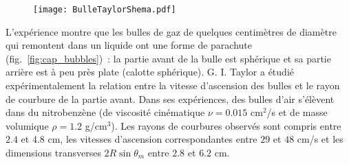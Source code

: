 \begin{figure}
  \begin{center}
\vspace{-9cm}
\texttt{[image: BulleTaylorShema.pdf]}
\vspace{-8cm}
  \end{center}
  \label{fig:geometrie_bulle}
\end{figure}


L'exp\'erience montre que les bulles de gaz de quelques centim\`etres de diam\`etre qui remontent 
dans un liquide ont une forme de parachute (fig.~\ref{fig:cap_bubbles})~:
la partie avant de la bulle est sph\'erique et sa partie arri\`ere
est \`a peu pr\`es plate (calotte sph\'erique).
G. I. Taylor a \'etudi\'e exp\'erimentalement la relation entre la vitesse
d'ascension des bulles et le rayon de courbure de la partie avant.
Dans ses exp\'eriences, des bulles d'air s'\'el\`event dans du nitrobenz\`ene
(de viscosit\'e cin\'ematique $\nu = 0.015$ cm$^2$/s et de masse volumique
$\rho = 1.2$ g/cm$^3$).
Les rayons de courbures observ\'es sont compris entre $2.4$ et $4.8$ cm,
les vitesses d'ascension correspondantes entre $29$ et $48$ cm/s
et les dimensions transverses $2R\sin\theta_m$ entre $2.8$ et $6.2$ cm.

